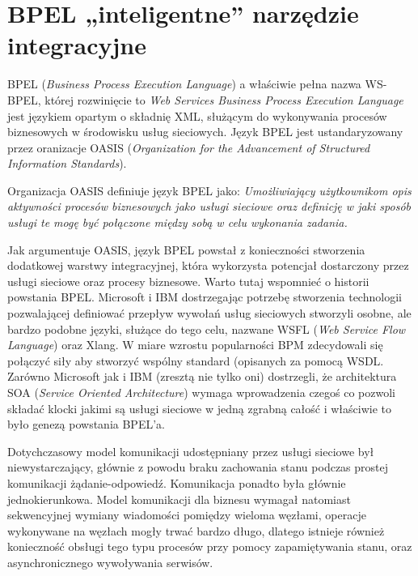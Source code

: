 \chapter{BPEL „inteligentne” narzędzie integracyjne}
\label{cha:bpel}

BPEL (\textit{Business Process Execution Language}) a właściwie pełna nazwa WS-BPEL,  której rozwinięcie to \textit{Web Services Business Process Execution Language} jest językiem opartym o składnię XML, służącym do wykonywania procesów biznesowych w środowisku  usług sieciowych. Język BPEL jest ustandaryzowany przez oranizacje OASIS (\textit{Organization for the Advancement of Structured Information Standards}). 

Organizacja OASIS definiuje język BPEL jako: \textit{Umożliwiający użytkownikom opis aktywności procesów biznesowych jako usługi sieciowe oraz definicję w jaki sposób usługi te mogę być połączone między sobą w celu wykonania zadania.} ~\cite{OASISweb}

Jak argumentuje OASIS, język BPEL powstał z konieczności stworzenia dodatkowej warstwy integracyjnej, która wykorzysta potencjał dostarczony przez usługi sieciowe oraz procesy biznesowe. Warto tutaj wspomnieć o historii powstania BPEL. Microsoft i IBM dostrzegając potrzebę stworzenia technologii pozwalającej definiować przepływ wywołań usług sieciowych stworzyli osobne, ale bardzo podobne języki, służące do tego celu, nazwane WSFL (\textit{Web Service Flow Language}) oraz Xlang. W miare wzrostu popularności BPM zdecydowali się połączyć siły aby stworzyć wspólny standard (opisanych za pomocą WSDL. Zarówno Microsoft jak i IBM (zresztą nie tylko oni) dostrzegli, że architektura SOA (\textit{Service Oriented Architecture}) wymaga wprowadzenia czegoś co pozwoli składać klocki jakimi są usługi sieciowe w jedną zgrabną całość i właściwie to było genezą powstania BPEL'a. 

Dotychczasowy model komunikacji udostępniany przez usługi sieciowe był niewystarczający, głównie z powodu braku zachowania stanu podczas prostej komunikacji żądanie-odpowiedź.  Komunikacja ponadto była głównie jednokierunkowa. Model komunikacji dla biznesu wymagał natomiast sekwencyjnej wymiany wiadomości pomiędzy wieloma węzłami, operacje wykonywane na węzłach mogły trwać bardzo długo, dlatego istnieje również konieczność obsługi tego typu procesów przy pomocy zapamiętywania stanu, oraz asynchronicznego wywoływania serwisów. ~\cite{OASISBPELSpec}


